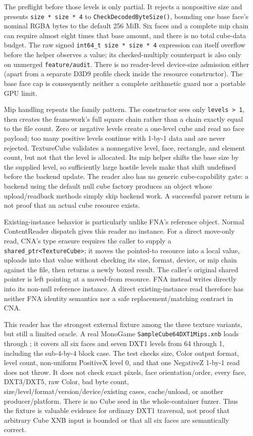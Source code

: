 The preflight before those levels is only partial. It rejects a nonpositive size and presents
\texttt{size * size * 4} to \texttt{CheckDecodedByteSize()}, bounding one base face's nominal
RGBA bytes to the default 256 MiB. Six faces and a complete mip chain can require almost eight
times that base amount, and there is no total cube-data budget. The raw signed
\texttt{int64\_t size * size * 4} expression can itself overflow before the helper observes a
value; its checked-multiply counterpart is also only on unmerged \texttt{feature/audit}. There
is no reader-level device-size admission either (apart from a separate D3D9 profile check inside
the resource constructor). The base face cap is consequently neither a complete arithmetic guard
nor a portable GPU limit.

Mip handling repeats the family pattern. The constructor sees only \texttt{levels > 1}, then
creates the framework's full square chain rather than a chain exactly equal to the file count.
Zero or negative levels create a one-level cube and read no face payload; too many positive levels
continue with 1-by-1 data and are never rejected. TextureCube validates a nonnegative level, face,
rectangle, and element count, but not that the level is allocated. Its mip helper shifts the base
size by the supplied level, so sufficiently large hostile levels make that shift undefined before
the backend update. The reader also has no generic cube-capability gate: a backend using the
default null cube factory produces an object whose upload/readback methods simply skip backend
work. A successful parser return is not proof that an actual cube resource exists.

Existing-instance behavior is particularly unlike FNA's reference object. Normal ContentReader
dispatch gives this reader no instance. For a direct move-only  read,
CNA's type erasure requires the caller to supply a \texttt{shared\_ptr<TextureCube>}; it moves the
pointed-to resource into a local value, uploads into that value without checking its size, format,
device, or mip chain against the file, then returns a newly boxed result. The caller's original
shared pointer is left pointing at a moved-from resource. FNA instead writes directly into its
non-null reference instance. A direct existing-instance read therefore has neither FNA identity
semantics nor a safe replacement/matching contract in CNA.

This reader has the strongest external fixture among the three texture variants, but still a
limited oracle. A real MonoGame \texttt{SampleCube64DXT1Mips.xnb} loads through
; it covers all six faces and seven DXT1 levels from 64 through 1,
including the sub-4-by-4 block case. The test checks size, Color output format, level count,
non-uniform PositiveX level 0, and that one NegativeZ 1-by-1 read does not throw. It does not
check exact pixels, face orientation/order, every face, DXT3/DXT5, raw Color, bad byte count,
size/level/format/version/device/existing cases, cache/unload, or another producer/platform.
There is no Cube seed in the whole-container fuzzer. Thus the fixture is valuable evidence for
ordinary DXT1 traversal, not proof that arbitrary Cube XNB input is bounded or that all six faces
are semantically correct.

